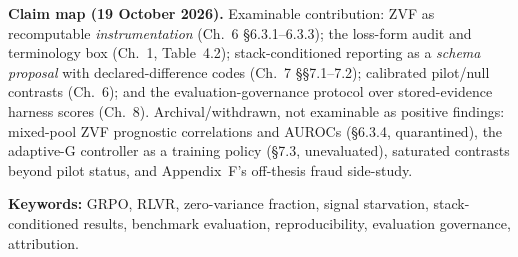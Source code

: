 \noindent\textbf{Claim map (19 October 2026).} Examinable contribution:
ZVF as recomputable \emph{instrumentation} (Ch.~6 \S6.3.1--6.3.3); the
loss-form audit and terminology box (Ch.~1, Table~4.2); stack-conditioned
reporting as a \emph{schema proposal} with declared-difference codes
(Ch.~7 \S\S7.1--7.2); calibrated pilot/null contrasts (Ch.~6); and the
evaluation-governance protocol over stored-evidence harness scores (Ch.~8).
Archival/withdrawn, not examinable as positive findings: mixed-pool ZVF
prognostic correlations and AUROCs (\S6.3.4, quarantined), the adaptive-G
controller as a training policy (\S7.3, unevaluated), saturated contrasts
beyond pilot status, and Appendix~F's off-thesis fraud side-study.

\vspace{0.25in}
\noindent\textbf{Keywords:} GRPO, RLVR, zero-variance fraction, signal
starvation, stack-conditioned results, benchmark evaluation, reproducibility,
evaluation governance, attribution.

\tableofcontents
\listoffigures
\listoftables
